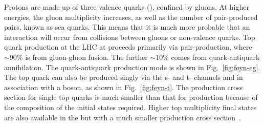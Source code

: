 Protons are made up of three valence quarks (\uquark{}\uquark{}\dquark{}), confined by gluons. 
At higher energies, the gluon multiplicity increases, as well as the number of pair-produced \qqbar{} pairs, known as sea quarks.
This means that it is much more probable that an interaction will occur from collisions between gluons or non-valence quarks.
Top quark production at the LHC at \com{} proceeds primarily via \ttbar{} pair-production, where $\sim90\%$ is from gluon-gluon fusion. 
The further $\sim10\%$ comes from quark-antiquark annihilation.
The quark-antiquark production mode is shown in Fig.~\ref{fig:feyn-eg}. 
The top quark can also be produced singly via the s- and t- channels and in association with a \Wboson{} boson, as shown in Fig.~\ref{fig:feyn-t}.
The production cross section for single top quarks is much smaller than that for \ttbar{} production because of the composition of the initial states required.
Higher top multiplicity final states are also available in the \SM{} but with a much smaller production cross section~\cite{Gen:MGamc}.

% 

